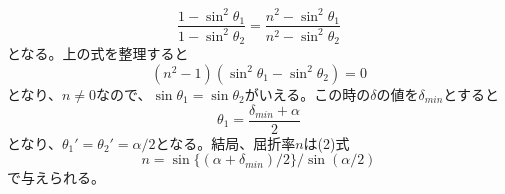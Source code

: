 \documentclass[a4paper,10pt]{jsarticle}
\begin{document}
\begin{equation}
  \frac{1-\sin^2{\theta_1}}{1-\sin^2{\theta_2}} = \frac{n^2-\sin^2{\theta_1}}{n^2-\sin^2{\theta_2}}
\end{equation}
となる。上の式を整理すると
\begin{equation}
  (n^2-1)(\sin^2{\theta_1}-\sin^2{\theta_2}) = 0
\end{equation}
となり、$n\ne0$なので、$\sin{\theta_1}=\sin{\theta_2}$がいえる。この時の$\delta$の値を$\delta_{min}$とすると
\begin{equation}
  \theta_1 = \frac{\delta_{min}+\alpha}{2}
\end{equation}
となり、$\theta_1'=\theta_2'=\alpha/2$となる。結局、屈折率$n$は(2)式
\begin{equation*}
  n =\sin\{(\alpha+\delta_{min})/2\}/\sin(\alpha/2)
\end{equation*}
で与えられる。
\end{document}
